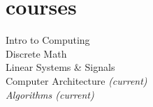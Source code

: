 \documentclass{cv_class}
\begin{document}
\section{courses}%
Intro to Computing\\
Discrete Math\\
Linear Systems \& Signals\\
Computer Architecture \itshape{(current)}\\
Algorithms \itshape{(current)}\\
\end{document}
